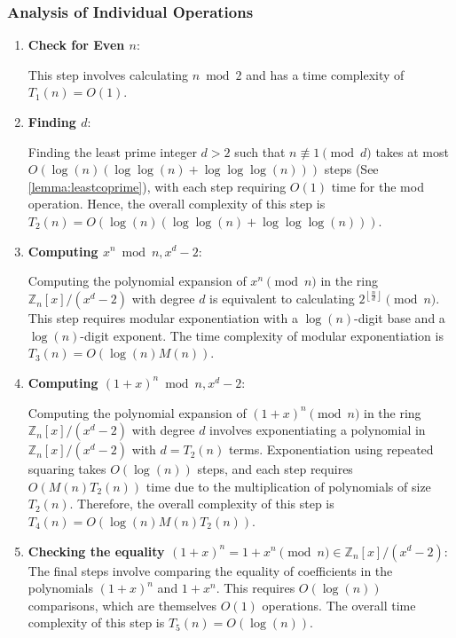 \documentclass{article}
\theoremstyle{plain}
\theoremstyle{definition}
\newcommand{\floor}[1]{\left\lfloor #1 \right\rfloor}
\newcommand{\Z}{\mathbb{Z}}
\newcommand{\Mx}{\Z_n[x]/(x^d-2)}
\begin{document}
\subsubsection{Analysis of Individual Operations}
\begin{enumerate}
    \item \textbf{Check for Even \( n \)}:
    
        This step involves calculating $n \bmod{2}$ and has a time complexity of \( T_1(n) = O(1) \).

    \item \textbf{Finding \( d \)}:
    
        Finding the least prime integer \( d > 2 \) such that $n \not\equiv 1 \pmod{d}$ takes at most \( O(\log (n) (\log \log (n) + \log \log \log (n))) \) steps (See \cref{lemma:leastcoprime}), with each step requiring \( O(1) \) time for the mod operation. Hence, the overall complexity of this step is \(  T_2(n) = O(\log (n) (\log \log (n) + \log \log \log (n))) \).

    \item \textbf{Computing \( x^n \bmod{n, x^d-2} \)}:
    
        Computing the polynomial expansion of $x^n \pmod{n}$ in the ring \( \Mx \) with degree $d$ is equivalent to calculating $2^{\floor{\frac{n}{d}}} \pmod{n}$. This step requires modular exponentiation with a \( \log(n) \)-digit base and a \( \log(n) \)-digit exponent. The time complexity of modular exponentiation is \(  T_3(n) = O(\log(n) M(n)) \).

    \item \textbf{Computing \( (1+x)^n \bmod{n, x^d-2} \)}:
    
        Computing the polynomial expansion of \( (1+x)^n \pmod{n} \) in the ring \( \Z_n[x]/(x^d-2) \)  with degree $d$ involves exponentiating a polynomial in $\Z_n[x]/(x^d-2)$ with \( d = T_2(n) \) terms. Exponentiation using repeated squaring takes \( O(\log(n)) \) steps, and each step requires \( O(M(n) T_2(n)) \) time due to the multiplication of polynomials of size \( T_2(n) \). Therefore, the overall complexity of this step is \(  T_4(n) = O(\log(n) M(n) T_2(n)) \).
         
    \item \textbf{Checking the equality \( (1+x)^n = 1 + x^n \pmod{n} \in \Z_n[x]/(x^d-2) \)}:
        The final steps involve comparing the equality of coefficients in the polynomials $(1+x)^n$ and $1 + x^n$. This requires $O(\log(n))$ comparisons, which are themselves \( O(1) \) operations. The overall time complexity of this step is $T_5(n) = O(\log(n))$.
\end{enumerate}
\end{document}
